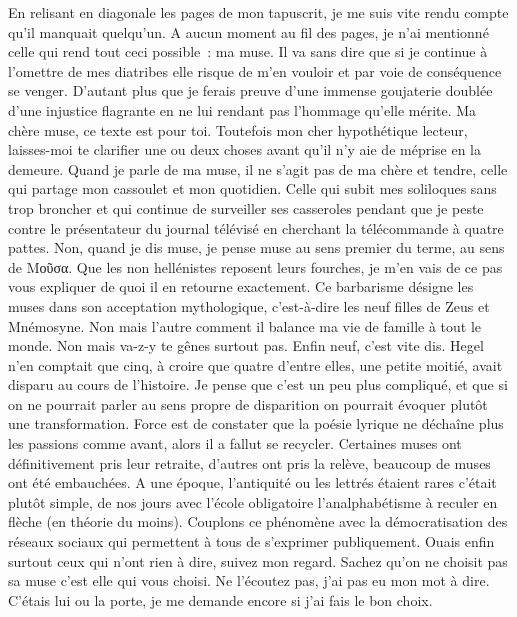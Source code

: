 ﻿En relisant en diagonale les pages de mon tapuscrit, je me suis vite rendu compte qu’il manquait quelqu’un. A aucun moment au fil des pages, je n’ai mentionné celle qui rend tout ceci possible : ma muse. Il va sans dire que si je continue à l’omettre de mes diatribes elle risque de m’en vouloir et par voie de conséquence se venger. D’autant plus que je ferais preuve d’une immense goujaterie doublée d’une injustice flagrante en ne lui rendant pas l’hommage qu’elle mérite.
Ma chère muse, ce texte est pour toi.
Toutefois mon cher hypothétique lecteur, laisses-moi te clarifier une ou deux choses avant qu’il n’y aie de méprise en la demeure. Quand je parle de ma muse, il ne s’agit pas de ma chère et tendre, celle qui partage mon cassoulet et mon quotidien. Celle qui subit mes soliloques sans trop broncher et qui continue de surveiller ses casseroles pendant que je peste contre le présentateur du journal télévisé en cherchant la télécommande à quatre pattes.
Non, quand je dis muse, je pense muse au sens premier du terme, au sens de Μοῦσα. Que les non hellénistes reposent leurs fourches, je m’en vais de ce pas vous expliquer de quoi il en retourne exactement. Ce barbarisme désigne les muses dans son acceptation mythologique, c’est-à-dire les neuf filles de Zeus et Mnémosyne. Non mais l’autre comment il balance ma vie de famille à tout le monde. Non mais va-z-y te gênes surtout pas. Enfin neuf, c’est vite dis. Hegel n’en comptait que cinq, à croire que quatre d’entre elles, une petite moitié, avait disparu au cours de l’histoire. Je pense que c’est un peu plus compliqué, et que si on ne pourrait parler au sens propre de disparition on pourrait évoquer plutôt une transformation. Force est de constater que la poésie lyrique ne déchaîne plus les passions comme avant, alors il a fallut se recycler. Certaines muses ont définitivement pris leur retraite, d’autres ont pris la relève, beaucoup de muses ont été embauchées. A une époque, l’antiquité ou les lettrés étaient rares c’était plutôt simple, de nos jours avec l’école obligatoire l’analphabétisme à reculer en flèche (en théorie du moins). Couplons ce phénomène avec la démocratisation des réseaux sociaux qui permettent à tous de s’exprimer publiquement. Ouais enfin surtout ceux qui n’ont rien à dire, suivez mon regard.
Sachez qu’on ne choisit pas sa muse c’est elle qui vous choisi. Ne l’écoutez pas, j’ai pas eu mon mot à dire. C’étais lui ou la porte, je me demande encore si j’ai fais le bon choix.
